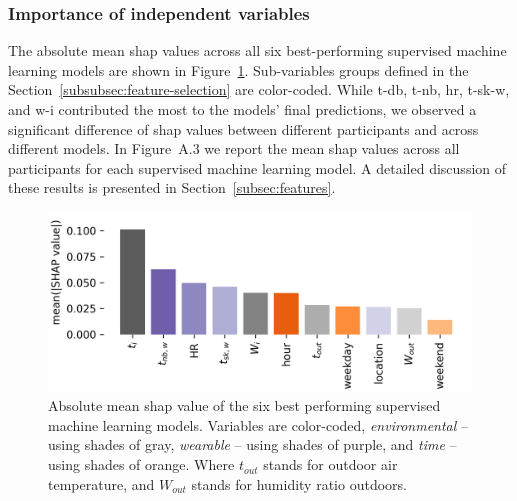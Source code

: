 \subsubsection{Importance of independent variables}
The absolute mean \gls{shap} values across all six best-performing supervised machine learning models are shown in Figure~\ref{fig:shapely_summary}.
Sub-variables groups defined in the Section~\ref{subsubsec:feature-selection} are color-coded.
While \acf{t-db}, \acf{t-nb}, \acf{hr}, \acf{t-sk-w}, and \acf{w-i} contributed the most to the models' final predictions, we observed a significant difference of \gls{shap} values between different participants and across different models.
In Figure~A.3 we report the mean \gls{shap} values across all participants for each supervised machine learning model.
A detailed discussion of these results is presented in Section~\ref{subsec:features}.
\begin{figure}
    \begin{center}
        \includegraphics[width=\linewidth,height=\textheight,keepaspectratio]{figures/figure_10}
    \end{center}
    \caption{Absolute mean \gls{shap} value of the six best performing supervised machine learning models.
    Variables are color-coded, \emph{environmental} -- using shades of gray, \emph{wearable} -- using shades of purple, and \emph{time} -- using shades of orange.
    Where $t_{out}$ stands for outdoor air temperature, and $W_{out}$ stands for humidity ratio outdoors.}\label{fig:shapely_summary}
\end{figure}